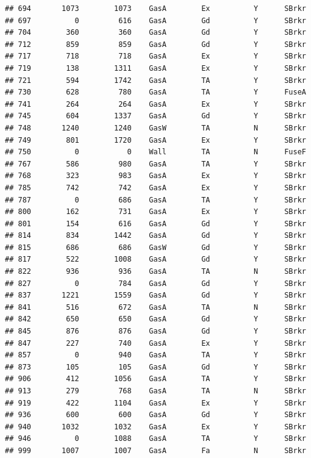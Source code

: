 \documentclass[]{article}
\begin{document}
\begin{verbatim}
## 694       1073        1073    GasA        Ex          Y      SBrkr
## 697          0         616    GasA        Gd          Y      SBrkr
## 704        360         360    GasA        Gd          Y      SBrkr
## 712        859         859    GasA        Gd          Y      SBrkr
## 717        718         718    GasA        Ex          Y      SBrkr
## 719        138        1311    GasA        Ex          Y      SBrkr
## 721        594        1742    GasA        TA          Y      SBrkr
## 730        628         780    GasA        TA          Y      FuseA
## 741        264         264    GasA        Ex          Y      SBrkr
## 745        604        1337    GasA        Gd          Y      SBrkr
## 748       1240        1240    GasW        TA          N      SBrkr
## 749        801        1720    GasA        Ex          Y      SBrkr
## 750          0           0    Wall        TA          N      FuseF
## 767        586         980    GasA        TA          Y      SBrkr
## 768        323         983    GasA        Ex          Y      SBrkr
## 785        742         742    GasA        Ex          Y      SBrkr
## 787          0         686    GasA        TA          Y      SBrkr
## 800        162         731    GasA        Ex          Y      SBrkr
## 801        154         616    GasA        Gd          Y      SBrkr
## 814        834        1442    GasA        Gd          Y      SBrkr
## 815        686         686    GasW        Gd          Y      SBrkr
## 817        522        1008    GasA        Gd          Y      SBrkr
## 822        936         936    GasA        TA          N      SBrkr
## 827          0         784    GasA        Gd          Y      SBrkr
## 837       1221        1559    GasA        Gd          Y      SBrkr
## 841        516         672    GasA        TA          N      SBrkr
## 842        650         650    GasA        Gd          Y      SBrkr
## 845        876         876    GasA        Gd          Y      SBrkr
## 847        227         740    GasA        Ex          Y      SBrkr
## 857          0         940    GasA        TA          Y      SBrkr
## 873        105         105    GasA        Gd          Y      SBrkr
## 906        412        1056    GasA        TA          Y      SBrkr
## 913        279         768    GasA        TA          N      SBrkr
## 919        422        1104    GasA        Ex          Y      SBrkr
## 936        600         600    GasA        Gd          Y      SBrkr
## 940       1032        1032    GasA        Ex          Y      SBrkr
## 946          0        1088    GasA        TA          Y      SBrkr
## 999       1007        1007    GasA        Fa          N      SBrkr

\end{verbatim}
\end{document}
